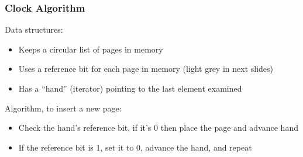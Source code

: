   \begin{frame}
    \frametitle{Clock Algorithm}

    Data structures:
    \begin{itemize}
      \item Keeps a circular list of pages in memory
      \item Uses a reference bit for each page in memory (light grey in next slides)
      \item Has a ``hand'' (iterator) pointing to the last element examined
    \end{itemize}

    \vspace{2em}
    Algorithm, to insert a new page:
    \begin{itemize}
      \item Check the hand's reference bit, if it's 0 then place the page and advance hand
      \item If the reference bit is 1, set it to 0, advance the hand, and repeat
    \end{itemize}
  \end{frame}

